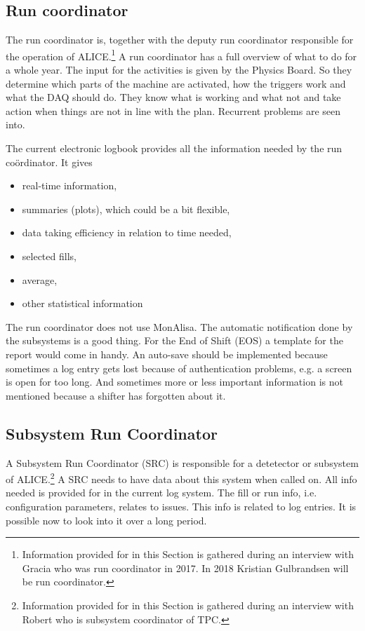 \subsection{Run coordinator}
The run coordinator is, together with the deputy run coordinator responsible for the operation of ALICE.\footnote{Information provided for in this Section is gathered during an interview with Gracia who was run coordinator in 2017. In 2018 Kristian Gulbrandsen will be run coordinator.} A run coordinator has a full overview of what to do for a whole year. The input for the activities is given by the Physics Board. So they determine which parts of the machine are activated, how the triggers work and what the DAQ should do. They know what is working and what not and take action when things are not in line with the plan. Recurrent problems are seen into. 

The current electronic logbook provides all the information needed by the run co\"ordinator. It gives
\begin{itemize}
  \item real-time information, 
  \item summaries (plots), which could be a bit flexible,
  \item data taking efficiency in relation to time needed,
  \item selected fills,
  \item average,
  \item other statistical information
\end{itemize}
 
The run coordinator does not use MonAlisa. The automatic notification done by the subsystems is a good thing. For the End of Shift (EOS) a template for the report would come in handy. An auto-save should be implemented because sometimes a log entry gets lost because of authentication problems, e.g. a screen is open for too long. And sometimes more or less important information is not mentioned because a shifter has forgotten about it.

\subsection{Subsystem Run Coordinator}
A Subsystem Run Coordinator (SRC) is responsible for a detetector or subsystem of ALICE.\footnote{Information provided for in this Section is gathered during an interview with Robert who is subsystem coordinator of TPC.} A SRC needs to have data about this system when called on. All info needed is provided for in the current log system. The fill or run info, i.e. configuration parameters, relates to issues. This info is related to log entries. It is possible now to look into it over a long period.

